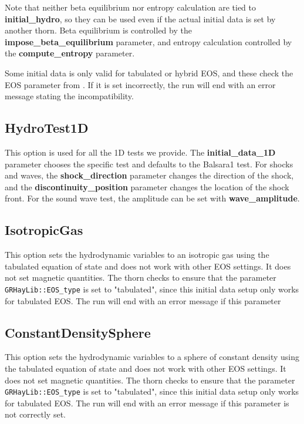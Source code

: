 \documentclass{article}
\begin{document}
Note that neither beta equilibrium nor entropy calculation are
tied to \textbf{initial\_hydro}, so they can be used even if
the actual initial data is set by another thorn. Beta equilibrium
is controlled by the \textbf{impose\_beta\_equilibrium} parameter,
and entropy calculation controlled by the \textbf{compute\_entropy}
parameter.

Some initial data is only valid for tabulated or hybrid EOS, and
these check the EOS parameter from \glib. If it is set incorrectly,
the run will end with an error message stating the incompatibility.

\subsection{HydroTest1D}

This option is used for all the 1D tests we provide. The
\textbf{initial\_data\_1D} parameter chooses the
specific test and defaults to the Balsara1 test. For shocks and
waves, the \textbf{shock\_direction} parameter changes the
direction of the shock, and the \textbf{discontinuity\_position}
parameter changes the location of the shock front. For the sound
wave test, the amplitude can be set with \textbf{wave\_amplitude}.

\subsection{IsotropicGas}

This option sets the hydrodynamic variables to an isotropic gas using
the tabulated equation of state and does not work with other EOS
settings. It does not set magnetic quantities. The thorn checks to
ensure that the \glib parameter \texttt{GRHayLib::EOS\_type} is set to
"tabulated", since this initial data setup only works for tabulated EOS.
The run will end with an error message if this parameter

\subsection{ConstantDensitySphere}

This option sets the hydrodynamic variables to a sphere of constant
density using the tabulated equation of state and does not work
with other EOS settings. It does not set magnetic quantities. The thorn
checks to ensure that the \glib parameter \texttt{GRHayLib::EOS\_type}
is set to "tabulated", since this initial data setup only works for
tabulated EOS. The run will end with an error message if this parameter
is not correctly set.

\end{document}
